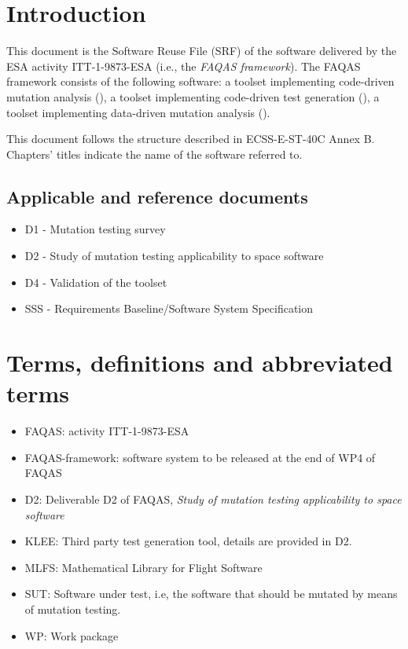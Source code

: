 
\chapter{Introduction}

This document is the Software Reuse File (SRF) of the software delivered by the ESA activity ITT-1-9873-ESA (i.e., the \emph{FAQAS framework}).
The FAQAS framework consists of the following software: a toolset  implementing code-driven mutation analysis (\MASS), a toolset implementing code-driven test generation (\SEMUS), a toolset implementing data-driven mutation analysis (\DAMA).

This document follows the structure described in ECSS-E-ST-40C Annex B. Chapters' titles indicate the name of the software referred to.

\section{Applicable and reference documents}

\begin{itemize}
\item{D1 - Mutation testing survey}
\item{D2 - Study of mutation testing applicability to space software}
\item{D4 - Validation of the toolset}
\item{SSS - Requirements Baseline/Software System Specification}
\end{itemize}

\chapter{Terms, definitions and abbreviated terms}

\begin{itemize}
\item{FAQAS}: activity ITT-1-9873-ESA
\item{FAQAS-framework}: software system to be released at the end of WP4 of FAQAS
\item{D2}: Deliverable D2 of FAQAS, \emph{Study of mutation testing applicability to space software}
\item{KLEE}: Third party test generation tool, details are provided in D2.
\item{MLFS}: Mathematical Library for Flight Software
\item{SUT}: Software under test, i.e, the software that should be mutated by means of mutation testing.
\item{WP}: Work package

\end{itemize}

\clearpage
